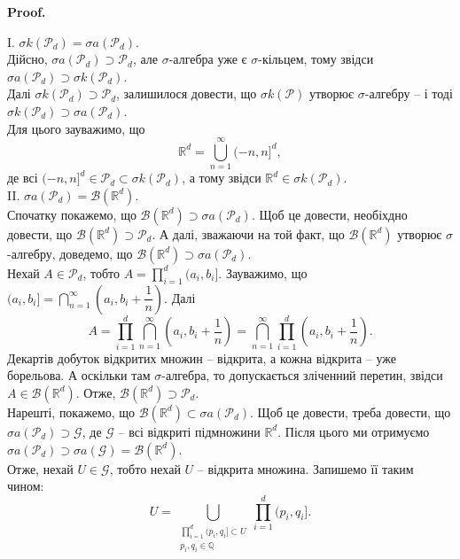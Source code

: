 \documentclass[a4paper, 10pt]{article}
\makeatletter
\theoremstyle{theoremdd}
\renewenvironment{proof}[1][Proof.\\]{\par
\pushQED{\hfill \qed}%
\normalfont \topsep6\p@\@plus6\p@\relax
\trivlist
\item\relax
{\bfseries
#1\@addpunct{.}}\hspace\labelsep\ignorespaces
}{%
\popQED\endtrivlist\@endpefalse
}
\makeatother
\begin{document}
\begin{proof}
I. $\sigma k(\mathcal{P}_d) = \sigma a(\mathcal{P}_d)$.\\
Дійсно, $\sigma a(\mathcal{P}_d) \supset \mathcal{P}_d$, але $\sigma$-алгебра уже є $\sigma$-кільцем, тому звідси $\sigma a(\mathcal{P}_d) \supset \sigma k(\mathcal{P}_d)$.\\
Далі $\sigma k(\mathcal{P}_d) \supset \mathcal{P}_d$, залишилося довести, що $\sigma k(\mathcal{P})$ утворює $\sigma$-алгебру -- і тоді $\sigma k(\mathcal{P}_d) \supset \sigma a(\mathcal{P}_d)$. \\
Для цього зауважимо, що \[
\mathbb{R}^d = \displaystyle\bigcup_{n =1}^\infty (-n,n]^d,
\]
де всі $(-n,n]^d \in \mathcal{P}_d \subset \sigma k(\mathcal{P}_d)$, а тому звідси $\mathbb{R}^d \in \sigma k(\mathcal{P}_d)$.
\bigskip \\
II. $\sigma a(\mathcal{P}_d) = \mathcal{B}(\mathbb{R}^d)$.\\
Спочатку покажемо, що $\mathcal{B}(\mathbb{R}^d) \supset \sigma a(\mathcal{P}_d)$. Щоб це довести, необіхдно довести, що $\mathcal{B}(\mathbb{R}^d) \supset \mathcal{P}_d$. А далі, зважаючи на той факт, що $\mathcal{B}(\mathbb{R}^d)$ утворює $\sigma$-алгебру, доведемо, що $\mathcal{B}(\mathbb{R}^d) \supset \sigma a(\mathcal{P}_d)$.\\
Нехай $A \in \mathcal{P}_d$, тобто $A = \displaystyle\prod_{i=1}^d (a_i,b_i]$. Зауважимо, що $(a_i,b_i] = \displaystyle\bigcap_{n=1}^\infty \left(a_i,b_i+\dfrac{1}{n}\right)$. Далі
\[
A = \displaystyle\prod_{i=1}^d \bigcap_{n=1}^\infty \left( a_i, b_i + \dfrac{1}{n} \right) = \bigcap_{n=1}^\infty \prod_{i=1}^d \left( a_i, b_i+\dfrac{1}{n}\right).
\]
Декартів добуток відкритих множин -- відкрита, а кожна відкрита -- уже борельова. А оскільки там $\sigma$-алгебра, то допускається зліченний перетин, звідси $A \in \mathcal{B}(\mathbb{R}^d)$. Отже, $\mathcal{B}(\mathbb{R}^d) \supset \mathcal{P}_d$.\\
Нарешті, покажемо, що $\mathcal{B}(\mathbb{R}^d) \subset \sigma a(\mathcal{P}_d)$. Щоб це довести, треба довести, що $\sigma a(\mathcal{P}_d) \supset \mathcal{G}$, де $\mathcal{G}$ -- всі відкриті підмножини $\mathbb{R}^d$. Після цього ми отримуємо $\sigma a(\mathcal{P}_d) \supset \sigma a(\mathcal{G}) = \mathcal{B}(\mathbb{R}^d)$.\\
Отже, нехай $U \in \mathcal{G}$, тобто нехай $U$ -- відкрита множина. Запишемо її таким чином:
\[
U = \displaystyle\bigcup_{\substack{\prod_{i=1}^d (p_i,q_i] \subset U \\ p_i,q_i \in \mathbb{Q}}} \prod_{i=1}^d (p_i,q_i].
\]
\end{proof}
\end{document}

